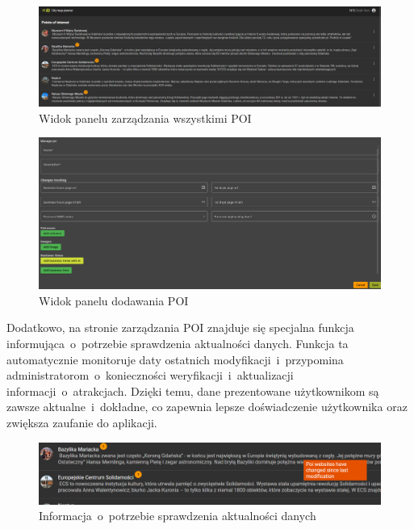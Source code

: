     \begin{figure}[H]
    \centering
    \includegraphics[width=1\textwidth]{attachments/poi-manage}
    \caption{Widok panelu zarządzania wszystkimi POI}
    \label{fig:poi-manage}
\end{figure}
\begin{figure}[H]
    \centering
    \includegraphics[width=1\textwidth]{attachments/addpoi}
    \caption{Widok panelu dodawania POI}
    \label{fig:ManageNofify}
\end{figure}

Dodatkowo, na stronie zarządzania POI znajduje się specjalna funkcja informująca~o~potrzebie sprawdzenia aktualności danych. 
Funkcja ta automatycznie monitoruje daty ostatnich modyfikacji~i~przypomina administratorom~o~konieczności weryfikacji~i~aktualizacji informacji~o~atrakcjach. 
Dzięki temu, dane prezentowane użytkownikom są zawsze aktualne~i~dokładne, co zapewnia lepsze doświadczenie użytkownika oraz zwiększa zaufanie do aplikacji.
\begin{figure}[H]
    \centering
    \includegraphics[width=1\textwidth]{attachments/poi-notify}
    \caption{Informacja~o~potrzebie sprawdzenia aktualności danych}
    \label{fig:ManageNofify}
\end{figure}

